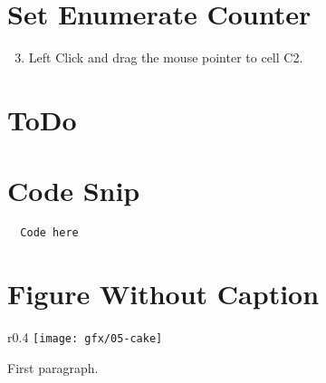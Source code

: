 \section{Set Enumerate Counter}
\begin{enumerate}
	\setcounter{enumi}{2} %
	
	\item Left Click and drag the mouse pointer to cell \textsf{C2}.
\end{enumerate}


\section{ToDo}

\section{Code Snip}
\begin{lstlisting}
  Code here
\end{lstlisting}

\section{Figure Without Caption}

\begin{wrapfigure}{r}{0.4\textwidth}
	\centering
	\texttt{[image: gfx/05-cake]} 
\end{wrapfigure}

First paragraph.

